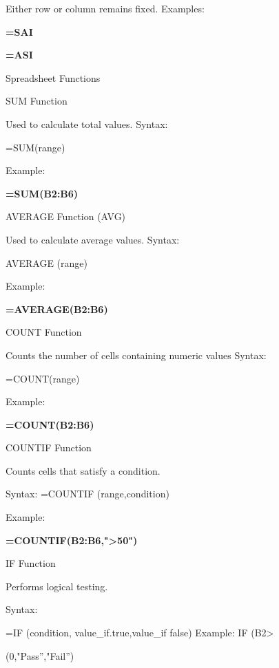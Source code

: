 \documentclass[10pt,a4paper]{article}
\begin{document}
\noindent Either row or column remains fixed. Examples:\par
\medskip\noindent\textbf{=SAI}\par
\medskip\noindent\textbf{=ASI}\par

\noindent Spreadsheet Functions\par
\noindent SUM Function\par
\noindent Used to calculate total values. Syntax:\par
\noindent =SUM(range)\par

\noindent Example:\par
\medskip\noindent\textbf{=SUM(B2:B6)}\par

\noindent AVERAGE Function (AVG)\par
\noindent Used to calculate average values. Syntax:\par
\noindent AVERAGE (range)\par

\noindent Example:\par
\medskip\noindent\textbf{=AVERAGE(B2:B6)}\par

\noindent COUNT Function\par
\noindent Counts the number of cells containing numeric values Syntax:\par
\noindent =COUNT(range)\par
\clearpage
\noindent Example:\par
\medskip\noindent\textbf{=COUNT(B2:B6)}\par

\noindent COUNTIF Function\par
\noindent Counts cells that satisfy a condition.\par
\noindent Syntax: =COUNTIF (range,condition)\par

\noindent Example:\par
\medskip\noindent\textbf{=COUNTIF(B2:B6,">50")}\par

\noindent IF Function\par
\noindent Performs logical testing.\par

\noindent Syntax:\par
\noindent =IF (condition, value\_if.true,value\_if false) Example: IF (B2>\par
\noindent (0,"Pass”,"Fail”)\par
\end{document}

